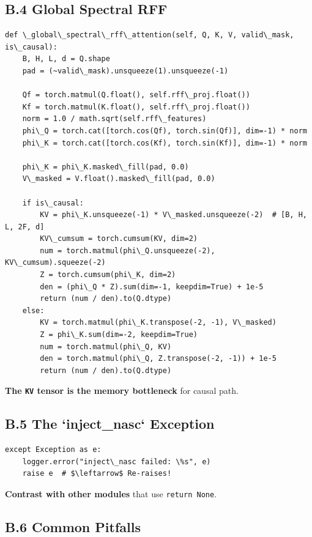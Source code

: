 \subsection{B.4 Global Spectral RFF}

\begin{lstlisting}
def \_global\_spectral\_rff\_attention(self, Q, K, V, valid\_mask, is\_causal):
    B, H, L, d = Q.shape
    pad = (~valid\_mask).unsqueeze(1).unsqueeze(-1)
    
    Qf = torch.matmul(Q.float(), self.rff\_proj.float())
    Kf = torch.matmul(K.float(), self.rff\_proj.float())
    norm = 1.0 / math.sqrt(self.rff\_features)
    phi\_Q = torch.cat([torch.cos(Qf), torch.sin(Qf)], dim=-1) * norm
    phi\_K = torch.cat([torch.cos(Kf), torch.sin(Kf)], dim=-1) * norm
    
    phi\_K = phi\_K.masked\_fill(pad, 0.0)
    V\_masked = V.float().masked\_fill(pad, 0.0)
    
    if is\_causal:
        KV = phi\_K.unsqueeze(-1) * V\_masked.unsqueeze(-2)  # [B, H, L, 2F, d]
        KV\_cumsum = torch.cumsum(KV, dim=2)
        num = torch.matmul(phi\_Q.unsqueeze(-2), KV\_cumsum).squeeze(-2)
        Z = torch.cumsum(phi\_K, dim=2)
        den = (phi\_Q * Z).sum(dim=-1, keepdim=True) + 1e-5
        return (num / den).to(Q.dtype)
    else:
        KV = torch.matmul(phi\_K.transpose(-2, -1), V\_masked)
        Z = phi\_K.sum(dim=-2, keepdim=True)
        num = torch.matmul(phi\_Q, KV)
        den = torch.matmul(phi\_Q, Z.transpose(-2, -1)) + 1e-5
        return (num / den).to(Q.dtype)
\end{lstlisting}

\textbf{The \texttt{KV} tensor is the memory bottleneck} for causal path.

\subsection{B.5 The `inject\_nasc` Exception}

\begin{lstlisting}
except Exception as e:
    logger.error("inject\_nasc failed: \%s", e)
    raise e  # $\leftarrow$ Re-raises!
\end{lstlisting}

\textbf{Contrast with other modules} that use \texttt{return None}.

\subsection{B.6 Common Pitfalls}

